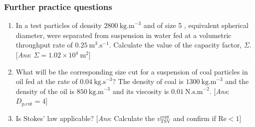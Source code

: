 \begin{frame}\frametitle{Further practice questions}
	\begin{enumerate}
		\item	In a test particles of density $2800~\text{kg.m}^{-3}$ and of size 5 \micron, equivalent spherical diameter, were separated from suspension in water fed at a volumetric throughput rate of $0.25~\text{m}^{3}\text{.s}^{-1}$. Calculate the value of the capacity factor, $\Sigma$. {\color{myOrange}\tiny{[\emph{Ans}: $\Sigma = 1.02 \times 10^4~\text{m}^2$]}}
		
		\vspace{12pt}
		\item	What will be the corresponding size cut for a suspension of coal particles in oil fed at the rate of $0.04~\text{kg.s}^{-3}$? The density of coal is $1300~\text{kg.m}^{-3}$ and the density of the oil is $850~\text{kg.m}^{-3}$ and its viscosity is $0.01~\text{N.s.m}^{-2}$. {\color{myOrange}\tiny{[\emph{Ans}: $D_\text{p,cut} = 4$\micron]}}
		
		\vspace{12pt}
		\item	Is Stokes' law applicable?  {\color{myOrange}\tiny{[\emph{Ans}: Calculate the $v_\text{TSV}^\text{cent}$ and confirm if Re$<1$]}}
	\end{enumerate}
\end{frame}

